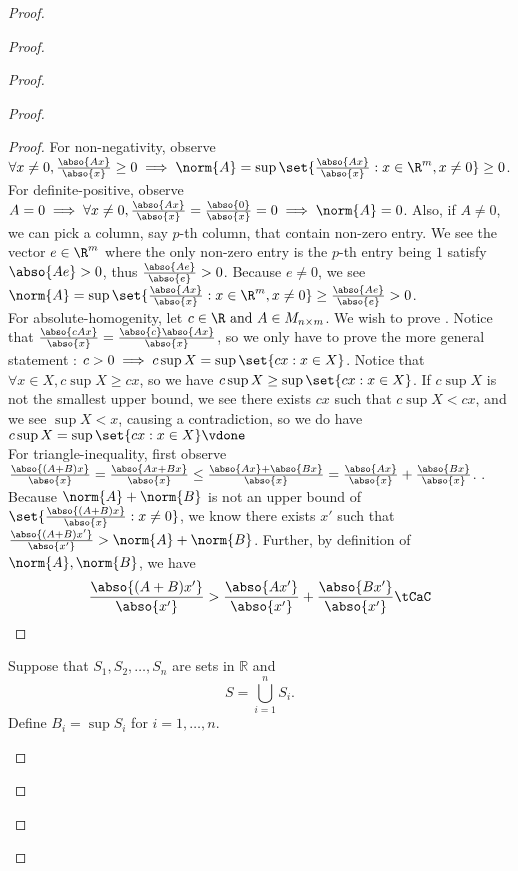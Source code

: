 \documentclass{report}
\begin{document}
\begin{proof}
\begin{proof}
\begin{proof}
\begin{proof}
\begin{proof}
For non-negativity, observe $\forall x\neq 0,\frac{\abso{Ax}}{\abso{x}}\geq 0 \implies \norm{A}=\sup \set{\frac{\abso{Ax}}{\abso{x}}:x \in \R^m, x\neq 0}\geq 0$.\\

For definite-positive, observe $A=0\implies \forall x\neq 0, \frac{\abso{Ax}}{\abso{x}}=\frac{\abso{0}}{\abso{x}}=0\implies \norm{A}=0$. Also, if $A\neq 0$, we can pick a column, say $p$-th column, that contain non-zero entry. We see the vector $e\in \R^m$ where the only non-zero entry is the  $p$-th entry being $1$ satisfy $\abso{Ae}>0$, thus $\frac{\abso{Ae}}{\abso{e}}>0$. Because $e\neq 0$, we see $\norm{A}=\sup \set{\frac{\abso{Ax}}{\abso{x}}:x\in\R^m,x\neq 0}\geq \frac{\abso{Ae}}{\abso{e}}>0$.\\

For absolute-homogenity, let $c \in \R\text{ and }A\in M_{n\times m}$. We wish to prove . Notice that $\frac{\abso{cAx}}{\abso{x}}=\frac{\abso{c}\abso{Ax}}{\abso{x}}$, so we only have to prove the more general statement : $c>0 \implies c \sup X= \sup \set{cx:x\in X}$. Notice that $\forall x \in X, c \sup X\geq cx$, so we have $c\sup X\geq \sup \set{cx:x\in X}$. If $c\sup X$ is not the smallest upper bound, we see there exists $cx$ such that $c\sup X<cx$, and we see $\sup X<x$, causing a contradiction, so we do have $c\sup X=\sup \set{cx:x\in X}\vdone$   \\

For triangle-inequality, first observe $\frac{\abso{(A+B)x}}{\abso{x}}=\frac{\abso{Ax+Bx}}{\abso{x}}\leq \frac{\abso{Ax}+\abso{Bx}}{\abso{x}}=\frac{\abso{Ax}}{\abso{x}}+\frac{\abso{Bx}}{\abso{x}}$. .\\

Because $\norm{A}+\norm{B}$ is not an upper bound of $\set{\frac{\abso{(A+B)x}}{\abso{x}}:x\neq 0}$, we know there exists $x'$ such that  $\frac{\abso{(A+B)x'}}{\abso{x'}}>\norm{A}+\norm{B}$. Further, by definition of $\norm{A},\norm{B}$, we have
\begin{equation*}
\frac{\abso{(A+B)x'}}{\abso{x'}}>\frac{\abso{Ax'}}{\abso{x'}}+\frac{\abso{Bx'}}{\abso{x'}}\tCaC
\end{equation*}
\end{proof}

\begin{question}{}{}
Suppose that \(S_1, S_2, \ldots, S_n\) are sets in \(\mathbb{R}\) and 
\[ S = \bigcup_{i=1}^{n} S_i. \]
Define \(B_i = \sup S_i\) for \(i = 1, \ldots, n\).


\end{question}
\end{proof}
\end{proof}
\end{proof}
\end{proof}
\end{document}
